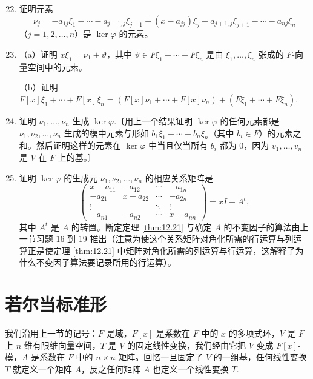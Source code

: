 \begin{enumerate}
\setcounter{enumi}{21}
\item 证明元素
\[
\nu_j = -a_{1j}\xi_1-\cdots-a_{j-1,j}\xi_{j-1}+(x-a_{jj})\xi_j-a_{j+1,j}\xi_{j+1}-\cdots-a_{nj}\xi_n
\]
（\(j = 1, 2, \ldots, n\)）是 \(\ker\varphi\) 的元素。

\item （a）证明 \(x\xi_1 = \nu_1+\vartheta\)，其中 \(\vartheta \in F\xi_1+\cdots+F\xi_n\) 是由 \(\xi_1, \ldots, \xi_n\) 张成的 \(F\)-向量空间中的元素。

（b）证明 \(F[x]\xi_1+\cdots+F[x]\xi_n = (F[x]\nu_1+\cdots+F[x]\nu_n)+(F\xi_1+\cdots+F\xi_n)\).

\item 证明 \(\nu_1, \ldots, \nu_n\) 生成 \(\ker\varphi\).〔用上一个结果证明 \(\ker\varphi\) 的任何元素都是 \(\nu_1, \nu_2, \ldots, \nu_n\) 生成的模中元素与形如 \(b_1\xi_1+\cdots+b_n\xi_n\)（其中 \(b_i \in F\)）的元素之和。然后证明这样的元素在 \(\ker\varphi\) 中当且仅当所有 \(b_i\) 都为 0，因为 \(v_1, \ldots, v_n\) 是 \(V\) 在 \(F\) 上的基。〕

\item 证明 \(\ker\varphi\) 的生成元 \(\nu_1, \nu_2, \ldots, \nu_n\) 的相应关系矩阵是
\[
\begin{pmatrix} x-a_{11} & -a_{12} & \cdots & -a_{1n} \\ -a_{21} & x-a_{22} & \cdots & -a_{2n} \\ \vdots & & \ddots & \vdots \\ -a_{n1} & -a_{n2} & \cdots & x-a_{nn} \end{pmatrix} = xI-A^t,
\]
其中 \(A^t\) 是 \(A\) 的转置。断定定理 \ref{thm:12.21} 与确定 \(A\) 的不变因子的算法由上一节习题 16 到 19 推出（注意为使这个关系矩阵对角化所需的行运算与列运算正是使定理 \ref{thm:12.21} 中矩阵对角化所需的列运算与行运算，这解释了为什么不变因子算法要记录所用的行运算）。
\end{enumerate}

\section{若尔当标准形}

我们沿用上一节的记号：\(F\) 是域，\(F[x]\) 是系数在 \(F\) 中的 \(x\) 的多项式环，\(V\) 是 \(F\) 上 \(n\) 维有限维向量空间，\(T\) 是 \(V\) 的固定线性变换，我们经由它把 \(V\) 变成 \(F[x]\)-模，\(A\) 是系数在 \(F\) 中的 \(n \times n\) 矩阵。回忆一旦固定了 \(V\) 的一组基，任何线性变换 \(T\) 就定义一个矩阵 \(A\)，反之任何矩阵 \(A\) 也定义一个线性变换 \(T\).

